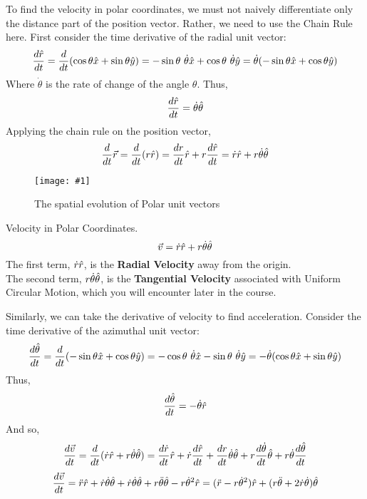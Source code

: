 \documentclass[11pt]{article}
\newcommand{\fig}[4]{
    \begin{figure}[H]
        \centering
        \texttt{[image: \#1]}
        \caption{#2}
        \label{exp4fit}
    \end{figure}
}
\theoremstyle{gangnamstyle}{\newtheorem{definition}{Definition}[]}
\theoremstyle{gangnamstyle}{\newtheorem{example}{Example}[]}
\theoremstyle{gangnamstyle}{\newtheorem{problem}{Problem}[]}
\begin{document}
To find the velocity in polar coordinates, we must not naively differentiate only the distance part of the position vector. Rather, we need to use the Chain Rule here. First consider the time derivative of the radial unit vector: 
\[ \frac{d\Hat{r}}{dt} = \frac{d}{dt}(\cos\theta\Hat{x} + \sin\theta\Hat{y}) = -\sin\theta \ \Dot{\theta} \Hat{x} + \cos\theta \ \Dot{\theta} \Hat{y} = \Dot{\theta}(-\sin\theta\Hat{x} + \cos\theta\Hat{y}) \]
Where $\Dot{\theta}$ is the rate of change of the angle $\theta$. Thus, 
\[ \frac{d\Hat{r}}{dt} = \Dot{\theta}\Hat{\theta} \]
Applying the chain rule on the position vector, 
\[ \frac{d}{dt} \Vec{r} = \frac{d}{dt} (r\Hat{r}) = \frac{dr}{dt}\Hat{r} + r\frac{d\Hat{r}}{dt} = \Dot{r}\Hat{r} + r\Dot{\theta}\Hat{\theta} \]

\fig{figs/n0/change.jpg}{The spatial evolution of Polar unit vectors}{0.1}{0}

\begin{definition}
Velocity in Polar Coordinates. \\
\begin{equation}
\Vec{v} = \Dot{r}\Hat{r} + r\Dot{\theta}\Hat{\theta}
\end{equation}
The first term, $\Dot{r}\Hat{r}$, is the \textbf{Radial Velocity} away from the origin. \\ 
The second term, $r\Dot{\theta}\Hat{\theta}$, is the \textbf{Tangential Velocity} associated with Uniform Circular Motion, which you will encounter later in the course. 
\end{definition}

Similarly, we can take the derivative of velocity to find acceleration. Consider the time derivative of the azimuthal unit vector: 
\[ \frac{d\Hat{\theta}}{dt} = \frac{d}{dt}(-\sin\theta\Hat{x} + \cos\theta\Hat{y}) = -\cos\theta \ \Dot{\theta}\Hat{x} - \sin\theta \ \Dot{\theta}\Hat{y} = -\Dot{\theta}(\cos\theta\Hat{x} + \sin\theta\Hat{y}) \]
Thus, 
\[ \frac{d\Hat{\theta}}{dt} = -\Dot{\theta}\Hat{r} \]
And so, 
\[ \frac{d\Vec{v}}{dt} = \frac{d}{dt}(\Dot{r}\Hat{r} + r\Dot{\theta}\Hat{\theta}) = \frac{d\Dot{r}}{dt}\Hat{r} + \Dot{r}\frac{d\Hat{r}}{dt} + \frac{dr}{dt}\Dot{\theta}\Hat{\theta} + r\frac{d\Dot{\theta}}{dt}\Hat{\theta} + r\Dot{\theta}\frac{d\Hat{\theta}}{dt} \]
\[ \frac{d\Vec{v}}{dt} = \Ddot{r}\Hat{r} + \Dot{r}\Dot{\theta}\Hat{\theta} + \Dot{r}\Dot{\theta}\Hat{\theta} + r\Ddot{\theta}\Hat{\theta} -r\Dot{\theta}^2\Hat{r} = (\Ddot{r} - r\Dot{\theta}^2)\Hat{r} + (r\Ddot{\theta} + 2\Dot{r}\Dot{\theta})\Hat{\theta} \]
\end{document}
